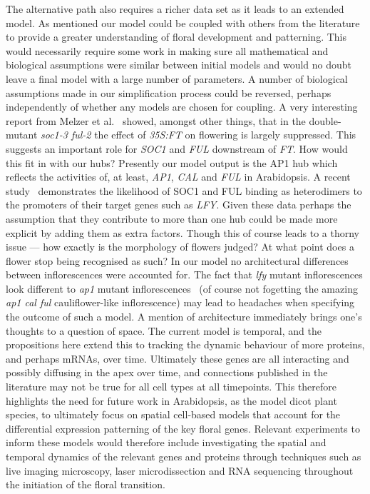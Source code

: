 The alternative path also requires a richer data set as it leads to an extended model.
As mentioned our model could be coupled with others from the literature to provide a greater understanding of floral development and patterning.
This would necessarily require some work in making sure all mathematical and biological assumptions were similar between initial models and would no doubt leave a final model with a large number of parameters.
A number of biological assumptions made in our simplification process could be reversed, perhaps independently of whether any models are chosen for coupling.
A very interesting report from Melzer et al.~\cite{melzer2008} showed, amongst other things, that in the double-mutant \emph{soc1-3 ful-2} the effect of \emph{35S:FT} on flowering is largely suppressed.
This suggests an important role for \emph{SOC1} and \emph{FUL} downstream of \emph{FT}.
How would this fit in with our hubs?
Presently our model output is the AP1 hub which reflects the activities of, at least, \emph{AP1}, \emph{CAL} and \emph{FUL} in Arabidopsis.
A recent study~\cite{balanza2014} demonstrates the likelihood of SOC1 and FUL binding as heterodimers to the promoters of their target genes such as \emph{LFY}.
Given these data perhaps the assumption that they contribute to more than one hub could be made more explicit by adding them as extra factors.
Though this of course leads to a thorny issue --- how exactly is the morphology of flowers judged?
At what point does a flower stop being recognised as such?
In our model no architectural differences between inflorescences were accounted for.
The fact that \emph{lfy} mutant inflorescences look different to \emph{ap1} mutant inflorescences~\cite{bowman1993} (of course not fogetting the amazing \emph{ap1 cal ful} cauliflower-like inflorescence) may lead to headaches when specifying the outcome of such a model.
A mention of architecture immediately brings one's thoughts to a question of space.
The current model is temporal, and the propositions here extend this to tracking the dynamic behaviour of more proteins, and perhaps mRNAs, over time.
Ultimately these genes are all interacting and possibly diffusing in the apex over time, and connections published in the literature may not be true for all cell types at all timepoints.
This therefore highlights the need for future work in Arabidopsis, as the model dicot plant species, to ultimately focus on spatial cell-based models that account for the differential expression patterning of the key floral genes.
Relevant experiments to inform these models would therefore include investigating the spatial and temporal dynamics of the relevant genes and proteins through techniques such as live imaging microscopy, laser microdissection and RNA sequencing throughout the initiation of the floral transition.
